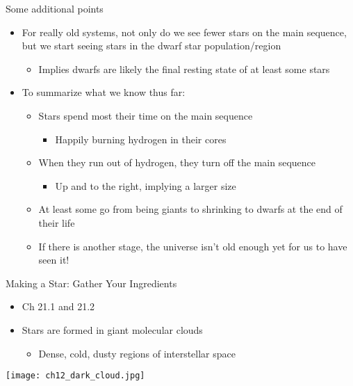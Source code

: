\documentclass[pdf, aspectratio=169]{beamer}
\begin{document}
\begin{frame}{Some additional points}
  \begin{itemize}
	\item For \alert{really} old systems, not only do we see fewer stars on the main sequence, but we start seeing stars in the dwarf star population/region
	  \begin{itemize}
		\item Implies dwarfs are likely the final resting state of at least some stars
	  \end{itemize}
	\item To summarize what we know thus far:
	  \begin{itemize}
		\item Stars spend most their time on the main sequence
		  \begin{itemize}
			\item Happily burning hydrogen in their cores
		  \end{itemize}
		\item When they run out of hydrogen, they turn off the main sequence
		  \begin{itemize}
			\item Up and to the right, implying a larger size
		  \end{itemize}
		\item At least some go from being giants to shrinking to dwarfs at the end of their life
		\item If there is another stage, the universe isn't old enough yet for us to have seen it!
	  \end{itemize}
  \end{itemize}
\end{frame}

\begin{frame}{Making a Star: Gather Your Ingredients}
  \begin{itemize}
	  \item Ch 21.1 and 21.2
	\item Stars are formed in giant molecular clouds
	  \begin{itemize}
		\item Dense, cold, dusty regions of interstellar space
	  \end{itemize}
  \end{itemize}
  \begin{center}
	\texttt{[image: ch12\_dark\_cloud.jpg]}
  \end{center}
\end{frame}
\end{document}
